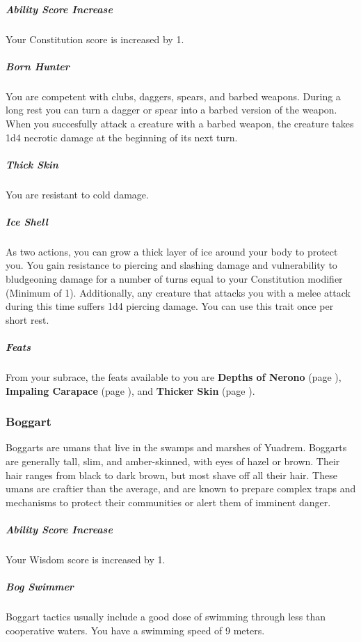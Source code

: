     \subparagraph{Ability Score Increase} Your Constitution score is increased by 1.


    \subparagraph{Born Hunter} You are competent with clubs, daggers, spears, and barbed weapons.
    During a long rest you can turn a dagger or spear into a barbed version of the weapon.
    When you succesfully attack a creature with a barbed weapon, the creature takes 1d4 necrotic damage at the beginning of its next turn.

    \subparagraph{Thick Skin} %
    You are resistant to cold damage.%

    \subparagraph{Ice Shell} As two actions, you can grow a thick layer of ice around your body to protect you.
    You gain resistance to piercing and slashing damage and vulnerability to bludgeoning damage for a number of turns equal to your Constitution modifier (Minimum of 1).
    Additionally, any creature that attacks you with a melee attack during this time suffers 1d4 piercing damage.
    You can use this trait once per short rest.

    \subparagraph{Feats} From your subrace, the feats available to you are
    \textbf{Depths of Nerono} (page \pageref{feat::depthsofnerono}),
    \textbf{Impaling Carapace} (page \pageref{feat::impalingcarapace}), and
    \textbf{Thicker Skin} (page \pageref{feat::thickerskin}).

\subsubsection{Boggart}
    Boggarts are umans that live in the swamps and marshes of Yuadrem.
    Boggarts are generally tall, slim, and amber-skinned, with eyes of hazel or brown.
    Their hair ranges from black to dark brown, but most shave off all their hair.
    These umans are craftier than the average, and are known to prepare complex traps and mechanisms to protect their communities or alert them of imminent danger.

    \subparagraph{Ability Score Increase} Your Wisdom score is increased by 1.

    \subparagraph{Bog Swimmer} Boggart tactics usually include a good dose of swimming through less than cooperative waters.
    You have a swimming speed of 9 meters.

